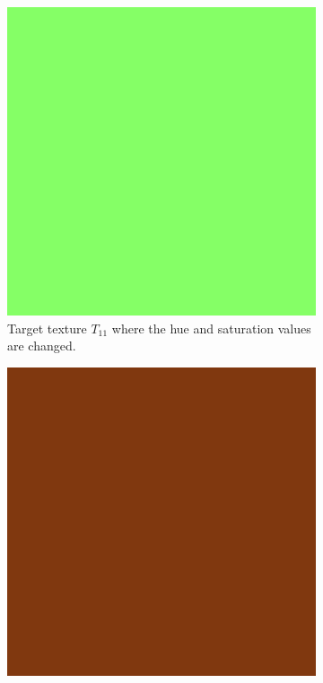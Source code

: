 \begin{figure}[!h]
\centering
\begin{subfigure}{.25\textwidth}
    \centering
    \includegraphics[width=\linewidth]{img/evaluation/hsv_target_h=0.3,s=0.6.png}
    \caption{Target texture $T_ {11}$ where the hue and saturation values are changed.}
    \label{fig:TargetsHSVShaderModelTwoParam}
\end{subfigure}\hspace{1.5cm}
\begin{subfigure}{.25\textwidth}
    \centering
    \includegraphics[width=\linewidth]{img/evaluation/hsv_random_target h=0.06,s=0.881,v=0.501.png}

\end{subfigure}
\end{figure}
